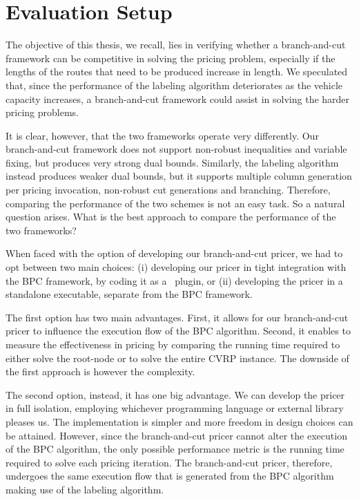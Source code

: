 \section{Evaluation Setup}
\label{sec:results-evaluation-setup}

The objective of this thesis, we recall, lies in verifying
whether a branch-and-cut framework can be competitive in solving
the pricing problem, especially if the lengths of the routes
that need to be produced increase in length.
We speculated that,
since the performance of the labeling algorithm deteriorates as the vehicle capacity increases,
a branch-and-cut framework could assist in solving the harder pricing problems.

It is clear, however, that the two frameworks operate very differently.
Our branch-and-cut framework does not support non-robust inequalities and variable fixing,
but produces very strong dual bounds.
Similarly, the labeling algorithm instead produces weaker dual bounds,
but it supports multiple column generation per pricing invocation,
non-robust cut generations and branching.
Therefore, comparing the performance of the two schemes is not an easy task.
So a natural question arises.
What is the best approach to compare the performance of the two frameworks?

\medskip

When faced with the option of developing our branch-and-cut pricer,
we had to opt between two main choices:
(i) developing our pricer in tight integration with the BPC framework,
by coding it as a \bapcod\ plugin,
or (ii) developing the pricer in a standalone executable,
separate from the BPC framework.

The first option has two main advantages.
First, it allows for our branch-and-cut pricer to influence the execution flow of the BPC algorithm.
Second, it enables to measure the effectiveness in pricing by comparing
the running time required to either solve the root-node or to solve the entire CVRP instance.
The downside of the first approach is however the complexity.

The second option, instead, it has one big advantage.
We can develop the pricer in full isolation, employing whichever programming
language or external library pleases us.
The implementation is simpler and more freedom in design choices can be attained.
However, since the branch-and-cut pricer cannot alter the execution of the BPC algorithm,
the only possible performance metric is the running time required to solve
each pricing iteration.
The branch-and-cut pricer, therefore, undergoes
the same execution flow that is generated from the BPC algorithm making use of the labeling algorithm.

